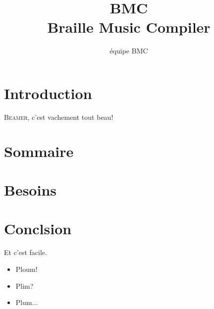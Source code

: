 \documentclass{beamer}
\title{BMC \\Braille Music Compiler}
\author{équipe BMC}\institute{ENSEIRB-MATMECA}
\begin{document}
\begin{frame}
  \titlepage
\end{frame}

\section*{Introduction}

\begin{frame}
  \textsc{Beamer}, c'est vachement tout beau!
\end{frame}


\section*{Sommaire}
\begin{frame}
\end{frame}

\section{Besoins}

\section*{Conclsion}

\begin{frame}
  Et c'est facile.
\end{frame}

  \begin{frame}
  \begin{itemize}
  \item<1,3> Ploum!
  \item<2-4> Plim?
  \item Plum...
  \end{itemize}
  \end{frame}
\end{document}
